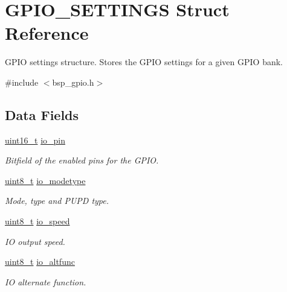 \hypertarget{struct_g_p_i_o___s_e_t_t_i_n_g_s}{}\section{G\+P\+I\+O\+\_\+\+S\+E\+T\+T\+I\+N\+GS Struct Reference}
\label{struct_g_p_i_o___s_e_t_t_i_n_g_s}


G\+P\+IO settings structure. Stores the G\+P\+IO settings for a given G\+P\+IO bank.  




{\ttfamily \#include $<$bsp\+\_\+gpio.\+h$>$}

\subsection*{Data Fields}
\begin{DoxyCompactItemize}
\item 
\hyperlink{stdint_8h_a273cf69d639a59973b6019625df33e30}{uint16\+\_\+t} \hyperlink{struct_g_p_i_o___s_e_t_t_i_n_g_s_aad1e743ccf6e6bc276e61f9ba35bdfd0}{io\+\_\+pin}
\begin{DoxyCompactList}\small\item\em Bitfield of the enabled pins for the G\+P\+IO. \end{DoxyCompactList}\item 
\hyperlink{stdint_8h_aba7bc1797add20fe3efdf37ced1182c5}{uint8\+\_\+t} \hyperlink{struct_g_p_i_o___s_e_t_t_i_n_g_s_aca4ea33051d3d932467e31db14e636aa}{io\+\_\+modetype}
\begin{DoxyCompactList}\small\item\em Mode, type and P\+U\+PD type. \end{DoxyCompactList}\item 
\hyperlink{stdint_8h_aba7bc1797add20fe3efdf37ced1182c5}{uint8\+\_\+t} \hyperlink{struct_g_p_i_o___s_e_t_t_i_n_g_s_aee8d1e0b4f18b0a599ebcbc2e0c8b60f}{io\+\_\+speed}
\begin{DoxyCompactList}\small\item\em IO output speed. \end{DoxyCompactList}\item 
\hyperlink{stdint_8h_aba7bc1797add20fe3efdf37ced1182c5}{uint8\+\_\+t} \hyperlink{struct_g_p_i_o___s_e_t_t_i_n_g_s_a4555d90ee383bdb9bf2fc3b049f32fd1}{io\+\_\+altfunc}
\begin{DoxyCompactList}\small\item\em IO alternate function. \end{DoxyCompactList}\end{DoxyCompactItemize}


